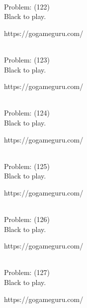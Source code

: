 \documentclass[11pt]{article}
\begin{document}
\begin{minipage}[t]{0.5\textwidth}
  {\centering
  
\\
Problem: (122)\\
Black to play.

https://gogameguru.com/\\
  }
\end{minipage}
\begin{minipage}[t]{0.5\textwidth}
  {\centering
  
\\
Problem: (123)\\
Black to play.

https://gogameguru.com/\\
  }
\end{minipage}
\begin{minipage}[t]{0.5\textwidth}
  {\centering
  
\\
Problem: (124)\\
Black to play.

https://gogameguru.com/\\
  }
\end{minipage}
\begin{minipage}[t]{0.5\textwidth}
  {\centering
  
\\
Problem: (125)\\
Black to play.

https://gogameguru.com/\\
  }
\end{minipage}
\begin{minipage}[t]{0.5\textwidth}
  {\centering
  
\\
Problem: (126)\\
Black to play.

https://gogameguru.com/\\
  }
\end{minipage}
\begin{minipage}[t]{0.5\textwidth}
  {\centering
  
\\
Problem: (127)\\
Black to play.

https://gogameguru.com/\\
  }
\end{minipage}
\end{document}
